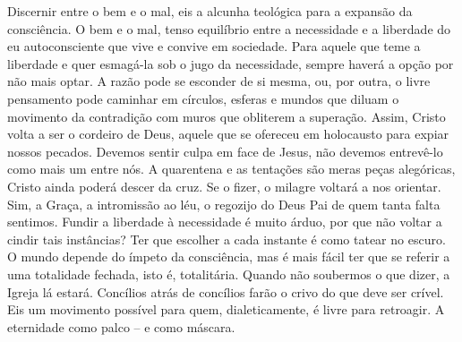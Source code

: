 Discernir entre o bem e o mal, eis a alcunha teológica para a expansão
da consciência. O bem e o mal, tenso equilíbrio entre a necessidade e a
liberdade do eu autoconsciente que vive e convive em sociedade. Para
aquele que teme a liberdade e quer esmagá-la sob o jugo da necessidade,
sempre haverá a opção por não mais optar. A razão pode se esconder de si
mesma, ou, por outra, o livre pensamento pode caminhar em círculos,
esferas e mundos que diluam o movimento da contradição com muros que
obliterem a superação. Assim, Cristo volta a ser o cordeiro de Deus,
aquele que se ofereceu em holocausto para expiar nossos pecados. Devemos
sentir culpa em face de Jesus, não devemos entrevê-lo como mais um entre
nós. A quarentena e as tentações são meras peças alegóricas, Cristo
ainda poderá descer da cruz. Se o fizer, o milagre voltará a nos
orientar. Sim, a Graça, a intromissão ao léu, o regozijo do Deus Pai de
quem tanta falta sentimos. Fundir a liberdade à necessidade é muito
árduo, por que não voltar a cindir tais instâncias? Ter que escolher a
cada instante é como tatear no escuro. O mundo depende do ímpeto da
consciência, mas é mais fácil ter que se referir a uma totalidade
fechada, isto é, totalitária. Quando não soubermos o que dizer, a Igreja
lá estará. Concílios atrás de concílios farão o crivo do que deve ser
crível. Eis um movimento possível para quem, dialeticamente, é livre
para retroagir. A eternidade como palco -- e como máscara.

